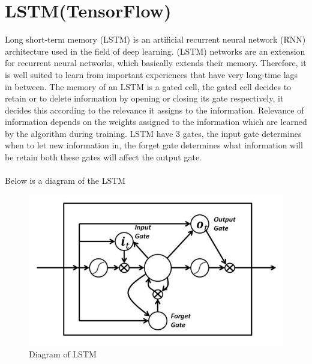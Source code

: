 \clearpage




\section{
LSTM(TensorFlow)
}
Long short-term memory (LSTM) is an artificial recurrent neural network (RNN) architecture used in the field of deep learning. (LSTM) networks are an extension for recurrent neural networks, which basically extends their memory. Therefore, it is well suited to learn from important experiences that have very long-time lags in between. 
The memory of an LSTM is a gated cell, the gated cell decides to retain or to delete information by opening or closing its gate respectively, it decides this according to the relevance it assigns to the information. Relevance of information depends on the weights assigned to the information which are learned by the algorithm during training. 
LSTM have 3 gates, the input gate determines when to let new information in, the forget gate determines what information will be retain both these gates will affect the output gate. \\ \\
Below is a diagram of the LSTM 

\begin{figure}[h]
    \centering
    \includegraphics[width=0.5\linewidth]{images/lstm.png}
    \caption{Diagram of LSTM}
\end{figure}


